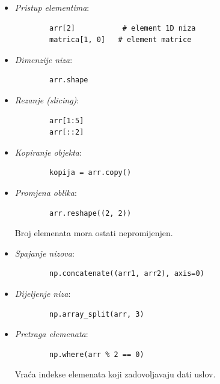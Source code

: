 \begin{itemize}
	
	\item \textit{Pristup elementima}: 
	
	\begin{verbatim}
		arr[2]           # element 1D niza
		matrica[1, 0]   # element matrice
	\end{verbatim}
	
	\item \textit{Dimenzije niza}:
	
	\begin{verbatim}
		arr.shape
	\end{verbatim}
	
	
	\item \textit{Rezanje (slicing)}:
	
	\begin{verbatim}
		arr[1:5]
		arr[::2]
	\end{verbatim}
	
	\item \textit{Kopiranje objekta}:
	\begin{verbatim}
		kopija = arr.copy()
	\end{verbatim}
	
	\item \textit{Promjena oblika}:
	\begin{verbatim}
		arr.reshape((2, 2))
	\end{verbatim}
	
	Broj elemenata mora ostati nepromijenjen.
	
	\item \textit{Spajanje nizova}:
	\begin{verbatim}
		np.concatenate((arr1, arr2), axis=0)
	\end{verbatim}
	
	\item \textit{Dijeljenje niza}:
	\begin{verbatim}
		np.array_split(arr, 3)
	\end{verbatim}
	
	\item \textit{Pretraga elemenata}:
	\begin{verbatim}
		np.where(arr % 2 == 0)
	\end{verbatim}
	
	Vraća indekse elemenata koji zadovoljavaju dati uslov.
	

\end{itemize}
